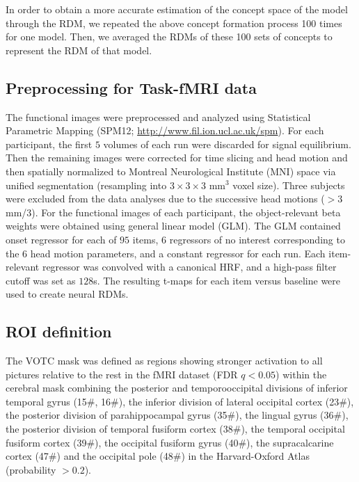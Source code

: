 \documentclass[pdflatex,sn-mathphys-num,lineno]{sn-jnl}%
\begin{document}
\begin{CJK}{UTF8}{gbsn}
In order to obtain a more accurate estimation of the concept space of the model through the RDM, we repeated the above concept formation process 100 times for one model. Then, we averaged the RDMs of these 100 sets of concepts to represent the RDM of that model.

\subsection{Preprocessing for Task-fMRI data}
The functional images were preprocessed and analyzed using Statistical Parametric Mapping (SPM12; \url{http://www.fil.ion.ucl.ac.uk/spm}). For each participant, the first $5$ volumes of each run were discarded for signal equilibrium. Then the remaining images were corrected for time slicing and head motion and then spatially normalized to Montreal Neurological Institute (MNI) space via unified segmentation (resampling into $3\times3\times3$ mm$^3$ voxel size). Three subjects were excluded from the data analyses due to the successive head motions ($>3$ mm/$3$\textdegree). For the functional images of each participant, the object-relevant beta weights were obtained using general linear model (GLM). The GLM contained onset regressor for each of $95$ items, $6$ regressors of no interest corresponding to the $6$ head motion parameters, and a constant regressor for each run. Each item-relevant regressor was convolved with a canonical HRF, and a high-pass filter cutoff was set as $128$s. The resulting t-maps for each item versus baseline were used to create neural RDMs.

\subsection{ROI definition}
The VOTC mask was defined as regions showing stronger activation to all pictures relative to the rest in the fMRI dataset (FDR $q < 0.05$) within the cerebral mask combining the posterior and temporooccipital divisions of inferior temporal gyrus (15\#, 16\#), the inferior division of lateral occipital cortex (23\#), the posterior division of parahippocampal gyrus (35\#), the lingual gyrus (36\#), the posterior division of temporal fusiform cortex (38\#), the temporal occipital fusiform cortex (39\#), the occipital fusiform gyrus (40\#), the supracalcarine cortex (47\#) and the occipital pole (48\#) in the Harvard-Oxford Atlas (probability $> 0.2$).


\end{CJK}
\end{document}
